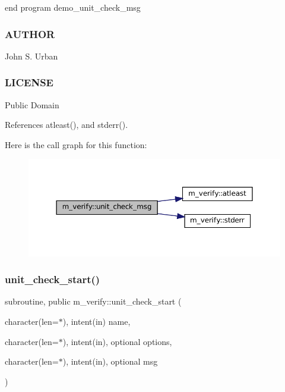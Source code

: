 end program demo\+\_\+unit\+\_\+check\+\_\+msg

\subsubsection*{A\+U\+T\+H\+OR}

John S. Urban \subsubsection*{L\+I\+C\+E\+N\+SE}

Public Domain 

References atleast(), and stderr().

Here is the call graph for this function\+:\nopagebreak
\begin{figure}[H]
\begin{center}
\leavevmode
\includegraphics[width=350pt]{namespacem__verify_a74ea8b4574606c4f72e97b115375fc9b_cgraph}
\end{center}
\end{figure}
\mbox{\label{namespacem__verify_ad753d0a58dbc02c8917bf2b2aa3e1de7}} 
\subsubsection{\texorpdfstring{unit\+\_\+check\+\_\+start()}{unit\_check\_start()}}
{\footnotesize\ttfamily subroutine, public m\+\_\+verify\+::unit\+\_\+check\+\_\+start (\begin{DoxyParamCaption}\item[{character(len=$\ast$), intent(in)}]{name,  }\item[{character(len=$\ast$), intent(in), optional}]{options,  }\item[{character(len=$\ast$), intent(in), optional}]{msg }\end{DoxyParamCaption})}



